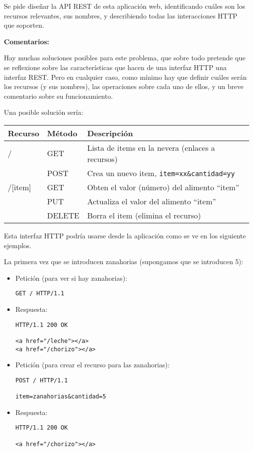 Se pide diseñar la API REST de esta aplicación web, identificando cuáles son los recursos relevantes, sus nombres, y describiendo todas las interacciones HTTP que soporten.

\textbf{Comentarios:}

Hay muchas soluciones posibles para este problema, que sobre todo pretende que se reflexione sobre las características que hacen de una interfaz HTTP una interfaz REST. Pero en cualquier caso, como mínimo hay que definir cuáles serán los recursos (y sus nombres), las operaciones sobre cada uno de ellos, y un breve comentario sobre su funcionamiento.

Una posible solución sería: \\

\begin{tabular}{l|l|p{10cm}}
  Recurso & Método & Descripción \\ \hline \hline
  /       & GET    & Lista de items en la nevera (enlaces a recursos) \\
          & POST   & Crea un nuevo item, \verb|item=xx&cantidad=yy| \\
  /[item] & GET    & Obten el valor (número) del alimento ``item'' \\
          & PUT    & Actualiza el valor del alimento ``item'' \\
          & DELETE & Borra el item (elimina el recurso) \\
\end{tabular}

Esta interfaz HTTP podría usarse desde la aplicación como se ve en los siguiente ejemplos.

La primera vez que se introducen zanahorias (supongamos que se introducen 5):

\begin{itemize}
\item Petición (para ver si hay zanahorias):
\begin{verbatim}
GET / HTTP/1.1
\end{verbatim}

\item Respuesta:
\begin{verbatim}
HTTP/1.1 200 OK

<a href="/leche"></a>
<a href="/chorizo"></a>
\end{verbatim}

\item Petición (para crear el recurso para las zanahorias):
\begin{verbatim}
POST / HTTP/1.1

item=zanahorias&cantidad=5
\end{verbatim}

\item Respuesta:
\begin{verbatim}
HTTP/1.1 200 OK

<a href="/chorizo"></a>
\end{verbatim}

\end{itemize}

